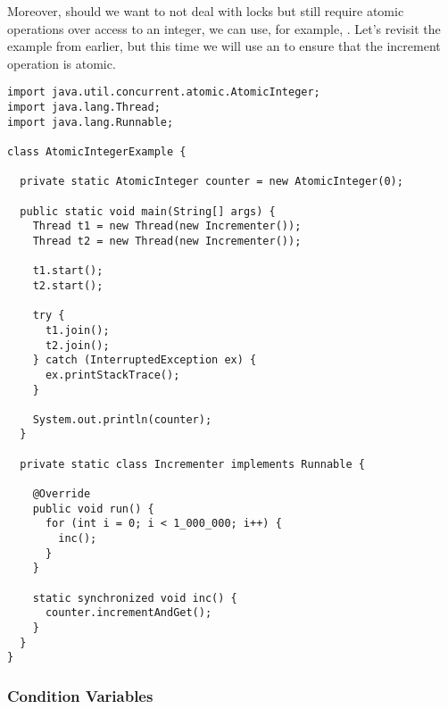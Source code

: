 Moreover, should we want to not deal with locks but still require atomic operations over access to an integer, we can use, for example, . 
Let's revisit the  example from earlier, but this time we will use an  to ensure that the increment operation is atomic.

\begin{lstlisting}[language=MyJava]
import java.util.concurrent.atomic.AtomicInteger;
import java.lang.Thread;
import java.lang.Runnable;

class AtomicIntegerExample {

  private static AtomicInteger counter = new AtomicInteger(0);

  public static void main(String[] args) {
    Thread t1 = new Thread(new Incrementer());
    Thread t2 = new Thread(new Incrementer());

    t1.start();
    t2.start();

    try {
      t1.join();
      t2.join();
    } catch (InterruptedException ex) { 
      ex.printStackTrace(); 
    }

    System.out.println(counter);
  }

  private static class Incrementer implements Runnable {

    @Override
    public void run() {
      for (int i = 0; i < 1_000_000; i++) { 
        inc(); 
      }
    }

    static synchronized void inc() {
      counter.incrementAndGet();
    }
  }
}
\end{lstlisting}



\subsubsection*{Condition Variables}

